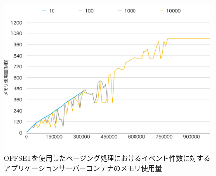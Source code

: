 \documentclass[../../../../../main]{subfiles}
\begin{document}
    \begin{figure}[H]
        \centering
        \includegraphics[width=12cm]{graph}
        \caption{OFFSETを使用したページング処理におけるイベント件数に対するアプリケーションサーバーコンテナのメモリ使用量}
        \label{fig:paging-offset-app-mem-app_1_1024-db_1_1024}
    \end{figure}
\end{document}
